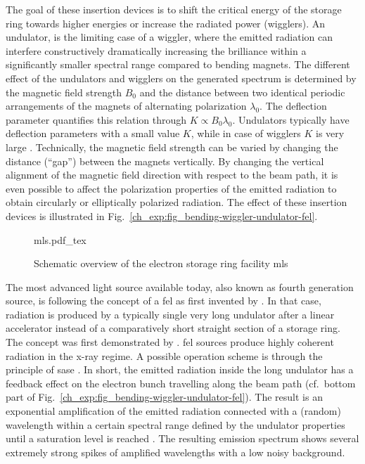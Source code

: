 The goal of these insertion devices is to shift the critical energy of the storage ring towards higher energies or increase the radiated power (wigglers). An undulator, is the limiting case of a wiggler, where the emitted radiation can interfere constructively dramatically increasing the brilliance within a significantly smaller spectral range compared to bending magnets. The different effect of the undulators and wigglers on the generated spectrum is determined by the magnetic field strength $B_0$ and the distance between two identical periodic arrangements of the magnets of alternating polarization $\lambda_0$. The deflection parameter quantifies this relation through $K \propto B_0 \lambda_0$. Undulators typically have deflection parameters with a small value $K$, while in case of wigglers $K$ is very large \cite{munro_chapter_1987}. Technically, the magnetic field strength can be varied by changing the distance (``gap'') between the magnets vertically. By changing the vertical alignment of the magnetic field direction with respect to the beam path, it is even possible to affect the polarization properties of the emitted radiation to obtain circularly or elliptically polarized radiation. The effect of these insertion devices is illustrated in Fig.~\ref{ch_exp:fig_bending-wiggler-undulator-fel}.
\begin{figure}[htb]
    \def\svgwidth{0.7\textwidth}
    {mls.pdf_tex}
    \caption[Schematic overview of the MLS]{Schematic overview of the electron storage ring facility \gls{mls}}
    \label{ch_exp:fig_mls}
\end{figure}


The most advanced light source available today, also known as fourth generation source, is following the concept of a \gls{fel} as first invented by \textcite{madey_stimulated_1971}. In that case, radiation is produced by a typically single very long undulator after a linear accelerator instead of a comparatively short straight section of a storage ring. The concept was first demonstrated by \textcite{deacon_first_1977}. \Gls{fel} sources produce highly coherent radiation in the x-ray regime. A possible operation scheme is through the principle of \gls{sase} \cite{derbenev_possibility_1982, bonifacio_collective_1984}. In short, the emitted radiation inside the long undulator has a feedback effect on the electron bunch travelling along the beam path (cf.~bottom part of Fig.~\ref{ch_exp:fig_bending-wiggler-undulator-fel}). The result is an exponential amplification of the emitted radiation connected with a (random) wavelength within a certain spectral range defined by the undulator properties until a saturation level is reached \cite{milton_exponential_2001}. The resulting emission spectrum shows several extremely strong spikes of amplified wavelengths with a low noisy background. 

